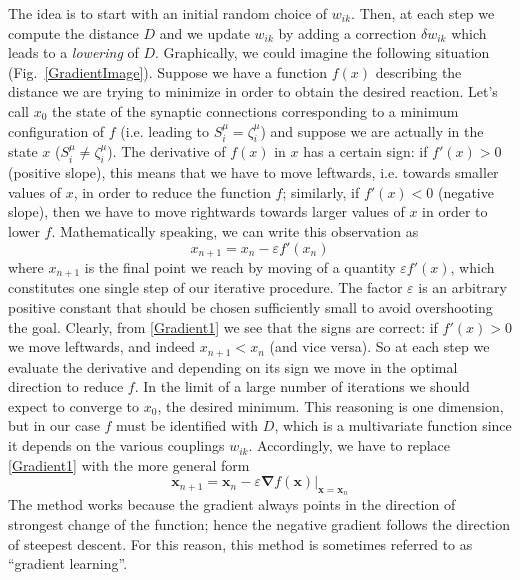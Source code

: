 The idea is to start with an initial random choice of $w_{ik}$. Then, at each step we compute the distance $D$ and we update $w_{ik}$ by adding a correction $\delta w_{ik}$ which leads to a \emph{lowering} of $D$. Graphically, we could imagine the following situation (Fig.~\ref{GradientImage}). Suppose we have a function $f(x)$ describing the distance we are trying to minimize in order to obtain the desired reaction. Let's call $x_0$ the state of the synaptic connections corresponding to a minimum configuration of $f$ (i.e. leading to $S_i^\mu=\zeta_i^\mu$) and suppose we are actually in the state $x$ ($S_i^\mu\neq\zeta_i^\mu$). The derivative of $f(x)$ in $x$ has a certain sign: if $f'(x)>0$ (positive slope), this means that we have to move leftwards, i.e. towards smaller values of $x$, in order to reduce the function $f$; similarly, if $f'(x)<0$ (negative slope), then we have to move rightwards towards larger values of $x$ in order to lower $f$. Mathematically speaking, we can write this observation as
\begin{equation}\label{Gradient1}
x_{n+1}=x_n-\varepsilon f'(x_n)
\end{equation}
where $x_{n+1}$ is the final point we reach by moving of a quantity $\varepsilon f'(x)$, which constitutes one single step of our iterative procedure. The factor $\varepsilon$ is an arbitrary positive constant that should be chosen sufficiently small to avoid overshooting the goal. Clearly, from \eqref{Gradient1} we see that the signs are correct: if $f'(x)>0$ we move leftwards, and indeed $x_{n+1}<x_{n}$ (and vice versa). So at each step we evaluate the derivative and depending on its sign we move in the optimal direction to reduce $f$. In the limit of a large number of iterations we should expect to converge to $x_0$, the desired minimum. This reasoning is one dimension, but in our case $f$ must be identified with $D$, which is a multivariate function since it depends on the various couplings $w_{ik}$. Accordingly, we have to replace \eqref{Gradient1} with the more general form
\begin{equation}\label{Gradient2}
\mathbf{x}_{n+1}=\mathbf{x}_n-\varepsilon{\boldsymbol{\nabla}f(\mathbf{x})\bigr|}_{\mathbf{x}=\mathbf{x}_n}
\end{equation}
The method works because the gradient always points in the direction of strongest change of the function; hence the negative gradient follows the direction of steepest descent. For this reason, this method is sometimes referred to as ``gradient learning''.
